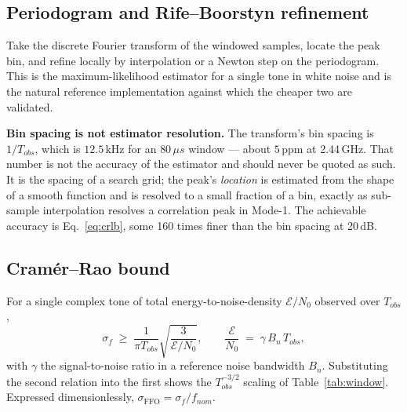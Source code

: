\documentclass[11pt,a4paper]{article}
\newcommand{\us}{\,\ensuremath{\upmu}s}
\newcommand{\FFO}{\mathrm{FFO}}
\providecommand{\upmu}{\mu}
\begin{document}
\subsection{Periodogram and Rife--Boorstyn refinement}

Take the discrete Fourier transform of the windowed samples, locate the peak bin, and refine locally
by interpolation or a Newton step on the periodogram. This is the maximum-likelihood estimator for a
single tone in white noise and is the natural reference implementation against which the cheaper two
are validated.

\begin{callout}
\textbf{Bin spacing is not estimator resolution.} The transform's bin spacing is $1/T_{obs}$, which is
$12.5$\,kHz for an $80\us$ window --- about $5$\,ppm at 2.44\,GHz. That number is not the accuracy of
the estimator and should never be quoted as such. It is the spacing of a search grid; the peak's
\emph{location} is estimated from the shape of a smooth function and is resolved to a small fraction
of a bin, exactly as sub-sample interpolation resolves a correlation peak in Mode-1. The achievable
accuracy is Eq.~\eqref{eq:crlb}, some 160 times finer than the bin spacing at 20\,dB.
\end{callout}

\subsection{Cram\'er--Rao bound}
\label{sec:crlb}

For a single complex tone of total energy-to-noise-density $\mathcal{E}/N_0$ observed over $T_{obs}$,
\begin{equation}
\sigma_f \;\ge\; \frac{1}{\pi T_{obs}}\sqrt{\frac{3}{\mathcal{E}/N_0}},
\qquad
\frac{\mathcal{E}}{N_0} \;=\; \gamma\,B_n\,T_{obs},
\label{eq:crlb}
\end{equation}
with $\gamma$ the signal-to-noise ratio in a reference noise bandwidth $B_n$. Substituting the second
relation into the first shows the $T_{obs}^{-3/2}$ scaling of Table~\ref{tab:window}. Expressed
dimensionlessly, $\sigma_\FFO = \sigma_f / f_{nom}$.
\end{document}
